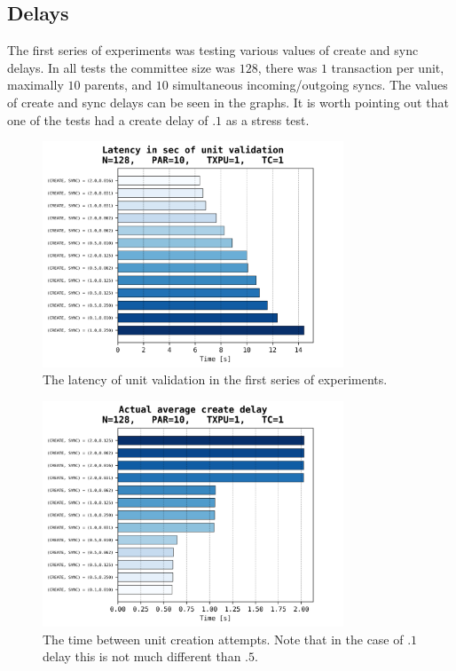 \documentclass[a4paper,10pt]{article}
\begin{document}
		\subsection{Delays}
		\FloatBarrier
			The first series of experiments was testing various values of create and sync delays.
			In all tests the committee size was $128$, there was $1$ transaction per unit, maximally $10$ parents, and $10$ simultaneous incoming/outgoing syncs.
			The values of create and sync delays can be seen in the graphs.
			It is worth pointing out that one of the tests had a create delay of $.1$ as a stress test.
			\begin{figure}[h]
				\centering
				\includegraphics[width=0.8\textwidth]{bar_plots/final_exp1/create_ord_del.png}
				\caption{The latency of unit validation in the first series of experiments.}
				\label{fig:delaysLatency}
			\end{figure}
			\begin{figure}[h]
				\centering
				\includegraphics[width=0.8\textwidth]{bar_plots/final_exp1/create_delay.png}
				\caption{The time between unit creation attempts. Note that in the case of $.1$ delay this is not much different than $.5$.}
				\label{fig:delaysCreateDelay}
			\end{figure}
\end{document}
